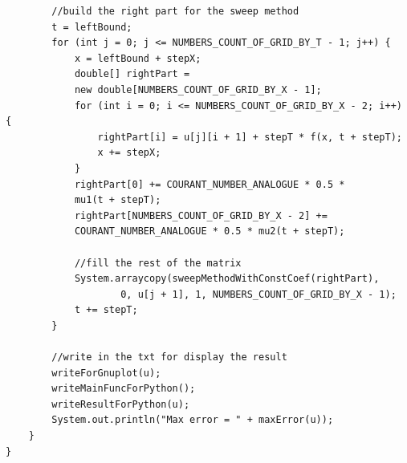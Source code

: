 \documentclass[12pt,a4paper]{scrartcl}
\begin{document}
\begin{verbatim}
        //build the right part for the sweep method
        t = leftBound;
        for (int j = 0; j <= NUMBERS_COUNT_OF_GRID_BY_T - 1; j++) {
            x = leftBound + stepX;
            double[] rightPart = 
            new double[NUMBERS_COUNT_OF_GRID_BY_X - 1];
            for (int i = 0; i <= NUMBERS_COUNT_OF_GRID_BY_X - 2; i++) {
                rightPart[i] = u[j][i + 1] + stepT * f(x, t + stepT);
                x += stepX;
            }
            rightPart[0] += COURANT_NUMBER_ANALOGUE * 0.5 * 
            mu1(t + stepT);
            rightPart[NUMBERS_COUNT_OF_GRID_BY_X - 2] +=
            COURANT_NUMBER_ANALOGUE * 0.5 * mu2(t + stepT);

            //fill the rest of the matrix
            System.arraycopy(sweepMethodWithConstCoef(rightPart),
                    0, u[j + 1], 1, NUMBERS_COUNT_OF_GRID_BY_X - 1);
            t += stepT;
        }

        //write in the txt for display the result
        writeForGnuplot(u);
        writeMainFuncForPython();
        writeResultForPython(u);
        System.out.println("Max error = " + maxError(u));
    }
}
\end{verbatim}
\end{document}
